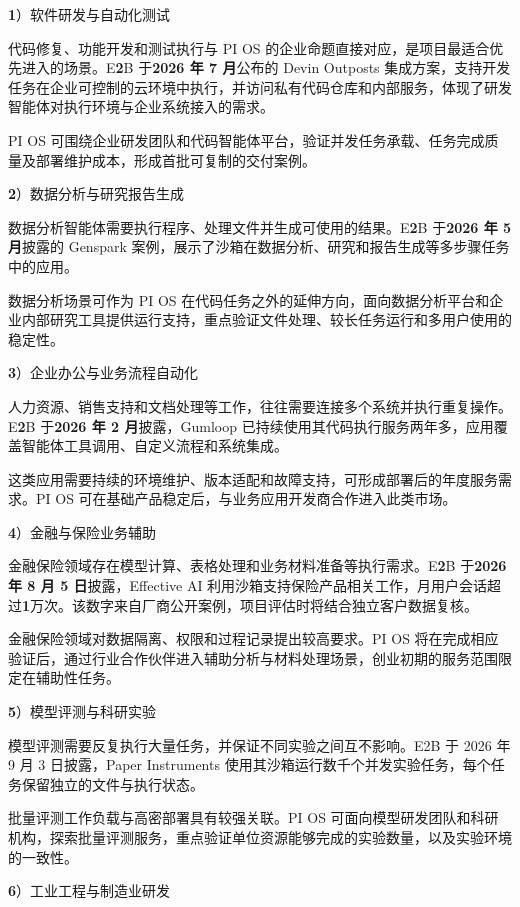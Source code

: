 \textbf{1}）软件研发与自动化测试

代码修复、功能开发和测试执行与 PI OS 的企业命题直接对应，是项目最适合优先进入的场景。E\textbf{2}B 于\textbf{2026 年 7 月}公布的 Devin Outposts 集成方案，支持开发任务在企业可控制的云环境中执行，并访问私有代码仓库和内部服务，体现了研发智能体对执行环境与企业系统接入的需求。

PI OS 可围绕企业研发团队和代码智能体平台，验证并发任务承载、任务完成质量及部署维护成本，形成首批可复制的交付案例。

\textbf{2}）数据分析与研究报告生成

数据分析智能体需要执行程序、处理文件并生成可使用的结果。E\textbf{2}B 于\textbf{2026 年 5 月}披露的 Genspark 案例，展示了沙箱在数据分析、研究和报告生成等多步骤任务中的应用。

数据分析场景可作为 PI OS 在代码任务之外的延伸方向，面向数据分析平台和企业内部研究工具提供运行支持，重点验证文件处理、较长任务运行和多用户使用的稳定性。

\textbf{3}）企业办公与业务流程自动化

人力资源、销售支持和文档处理等工作，往往需要连接多个系统并执行重复操作。E\textbf{2}B 于\textbf{2026 年 2 月}披露，Gumloop 已持续使用其代码执行服务两年多，应用覆盖智能体工具调用、自定义流程和系统集成。

这类应用需要持续的环境维护、版本适配和故障支持，可形成部署后的年度服务需求。PI OS 可在基础产品稳定后，与业务应用开发商合作进入此类市场。

\textbf{4}）金融与保险业务辅助

金融保险领域存在模型计算、表格处理和业务材料准备等执行需求。E\textbf{2}B 于\textbf{2026 年 8 月 5 日}披露，Effective AI 利用沙箱支持保险产品相关工作，月用户会话超过\textbf{1}万次。该数字来自厂商公开案例，项目评估时将结合独立客户数据复核。

金融保险领域对数据隔离、权限和过程记录提出较高要求。PI OS 将在完成相应验证后，通过行业合作伙伴进入辅助分析与材料处理场景，创业初期的服务范围限定在辅助性任务。

\textbf{5}）模型评测与科研实验

模型评测需要反复执行大量任务，并保证不同实验之间互不影响。E2B 于 2026 年 9 月 3 日披露，Paper Instruments 使用其沙箱运行数千个并发实验任务，每个任务保留独立的文件与执行状态。

批量评测工作负载与高密部署具有较强关联。PI OS 可面向模型研发团队和科研机构，探索批量评测服务，重点验证单位资源能够完成的实验数量，以及实验环境的一致性。

\textbf{6}）工业工程与制造业研发

